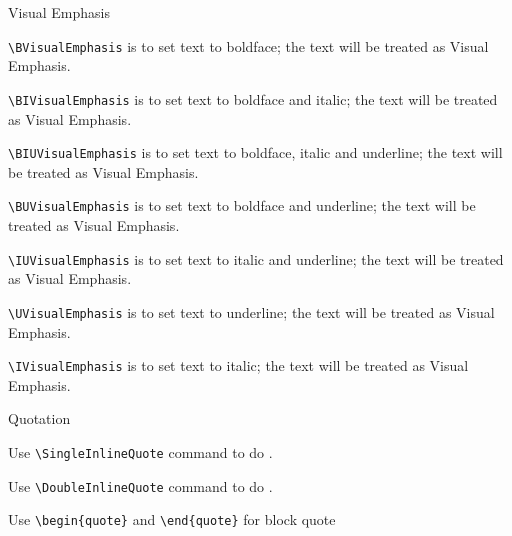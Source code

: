 \documentclass[12pt,Bold,letterpaper,TexShade]{mcgilletdclass}
\numberwithin{equation}{section}
\begin{document}
\begin{BulletList}
		\item{Visual Emphasis}
		\begin{romanList}
			\item{ \verb=\BVisualEmphasis= is to set text to boldface; the text will be treated as Visual Emphasis}.
			\item{ \verb=\BIVisualEmphasis= is to set text to boldface and italic; the text will be treated as Visual Emphasis}.
			\item{ \verb=\BIUVisualEmphasis= is to set text to boldface, italic and underline; the text will be treated as Visual Emphasis}.
			\item{ \verb=\BUVisualEmphasis= is to set text to boldface and underline; the text will be treated as Visual Emphasis}.
			\item{ \verb=\IUVisualEmphasis= is to set text to italic and underline; the text will be treated as Visual Emphasis}.
			\item{ \verb=\UVisualEmphasis= is to set text to underline; the text will be treated as Visual Emphasis}.
			\item{ \verb=\IVisualEmphasis= is to set text to italic; the text will be treated as Visual Emphasis}.
		\end{romanList}
		
		\item{Quotation}
			\begin{romanList}
			\item{Use \verb=\SingleInlineQuote= command to do . }
			\item{Use \verb=\DoubleInlineQuote= command to do . }
			\item{Use \verb=\begin{quote}= and \verb=\end{quote}= for block quote}
			\end{romanList}


\end{BulletList}
\end{document}
